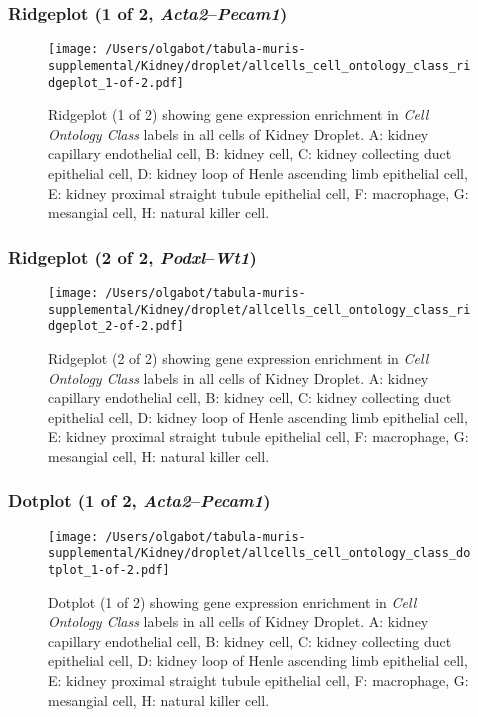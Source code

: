 \clearpage

\subsubsection{Ridgeplot (1 of 2, \emph{Acta2}--\emph{Pecam1})}
\begin{figure}[h]
\centering
\texttt{[image: /Users/olgabot/tabula-muris-supplemental/Kidney/droplet/allcells\_cell\_ontology\_class\_ridgeplot\_1-of-2.pdf]}

\caption{ Ridgeplot (1 of 2)  showing gene expression enrichment in \emph{Cell Ontology Class} labels in all cells of Kidney Droplet. A: kidney capillary endothelial cell, B: kidney cell, C: kidney collecting duct epithelial cell, D: kidney loop of Henle ascending limb epithelial cell, E: kidney proximal straight tubule epithelial cell, F: macrophage, G: mesangial cell, H: natural killer cell.}
\end{figure}


\clearpage

\subsubsection{Ridgeplot (2 of 2, \emph{Podxl}--\emph{Wt1})}
\begin{figure}[h]
\centering
\texttt{[image: /Users/olgabot/tabula-muris-supplemental/Kidney/droplet/allcells\_cell\_ontology\_class\_ridgeplot\_2-of-2.pdf]}

\caption{ Ridgeplot (2 of 2)  showing gene expression enrichment in \emph{Cell Ontology Class} labels in all cells of Kidney Droplet. A: kidney capillary endothelial cell, B: kidney cell, C: kidney collecting duct epithelial cell, D: kidney loop of Henle ascending limb epithelial cell, E: kidney proximal straight tubule epithelial cell, F: macrophage, G: mesangial cell, H: natural killer cell.}
\end{figure}


\clearpage

\subsubsection{Dotplot (1 of 2, \emph{Acta2}--\emph{Pecam1})}
\begin{figure}[h]
\centering
\texttt{[image: /Users/olgabot/tabula-muris-supplemental/Kidney/droplet/allcells\_cell\_ontology\_class\_dotplot\_1-of-2.pdf]}

\caption{ Dotplot (1 of 2)  showing gene expression enrichment in \emph{Cell Ontology Class} labels in all cells of Kidney Droplet. A: kidney capillary endothelial cell, B: kidney cell, C: kidney collecting duct epithelial cell, D: kidney loop of Henle ascending limb epithelial cell, E: kidney proximal straight tubule epithelial cell, F: macrophage, G: mesangial cell, H: natural killer cell.}
\end{figure}


